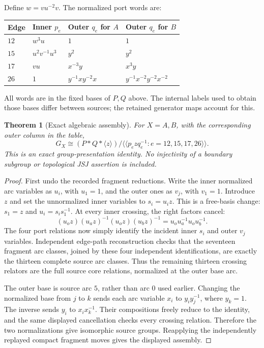 \documentclass[11pt]{article}
\newtheorem{theorem}{Theorem}
\begin{document}
Define $w=v u^{-2}v$. The normalized port words are:
\begin{center}
\begin{tabular}{llll}
\toprule
Edge & Inner $p_e$ & Outer $q_e$ for $A$ & Outer $q_e$ for $B$\\
\midrule
$12$ & $w^3u$ & $1$ & $1$\\
$15$ & $u^2v^{-1}u^3$ & $y^2$ & $y^2$\\
$17$ & $vu$ & $x^{-3}y$ & $x^3y$\\
$26$ & $1$ & $y^{-1}xy^{-2}x$ & $y^{-1}x^{-2}y^{-2}x^{-2}$\\
\bottomrule
\end{tabular}
\end{center}
All words are in the fixed bases of $P,Q$ above. The internal labels
used to obtain those bases differ between sources; the retained
generator maps account for this.

\begin{theorem}[Exact algebraic assembly]\label{thm:assembly}
For $X=A,B$, with the corresponding outer column in the table,
\[
 G_X\cong
 (P*Q*\langle z\rangle)\big/
 \langle\!\langle p_e zq_e^{-1}:e=12,15,17,26\rangle\!\rangle.
\]
This is an exact group-presentation identity. No injectivity of a
boundary subgroup or topological JSJ assertion is included.
\end{theorem}

\begin{proof}
First undo the recorded fragment reductions. Write the inner normalized
arc variables as $u_i$, with $u_1=1$, and the outer ones as $v_j$, with
$v_1=1$. Introduce $z$ and set the unnormalized inner variables to
$s_i=u_i z$. This is a free-basis change: $s_1=z$ and
$u_i=s_i s_1^{-1}$. At every inner crossing, the right factors cancel:
\[
 (u_o z)(u_a z)^{-1}(u_o z)(u_b z)^{-1}
 =u_o u_a^{-1}u_o u_b^{-1}.
\]
The four port relations now simply identify the incident inner $s_i$
and outer $v_j$ variables. Independent edge-path reconstruction checks
that the seventeen fragment arc classes, joined by these four
independent identifications, are exactly the thirteen complete source
arc classes. Thus the remaining thirteen crossing relators are the
full source core relations, normalized at the outer base arc.

The outer base is source arc $5$, rather than arc $0$ used earlier.
Changing the normalized base from $j$ to $k$ sends each arc variable
$x_i$ to $y_i y_j^{-1}$, where $y_k=1$. The inverse sends $y_i$ to
$x_i x_k^{-1}$. Their compositions freely reduce to the identity, and
the same displayed cancellation checks every crossing relation.
Therefore the two normalizations give isomorphic source groups.
Reapplying the independently replayed compact fragment moves gives
the displayed assembly.
\end{proof}
\end{document}
